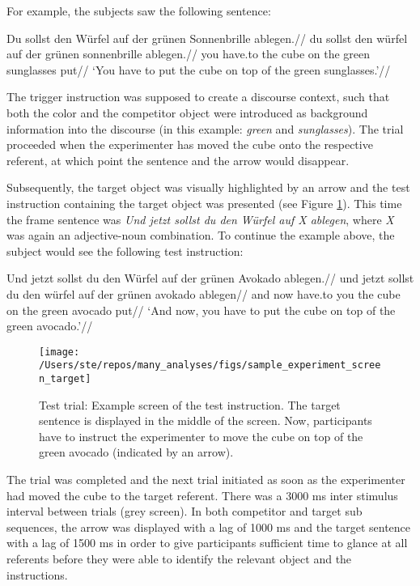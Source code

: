 \documentclass[
  12pt,
]{article}
\begin{document}
For example, the subjects saw the following sentence:

\ex \begingl
\glpreamble Du sollst den Würfel auf der grünen Sonnenbrille ablegen.//
\gla du sollst den würfel auf der grünen sonnenbrille ablegen.//
\glb you have.to the cube on the green sunglasses put//
\glft `You have to put the cube on top of the green sunglasses.'//
\endgl \xe

The trigger instruction was supposed to create a discourse context, such that both the color and the competitor object were introduced as background information into the discourse (in this example: \emph{green} and \emph{sunglasses}).
The trial proceeded when the experimenter has moved the cube onto the respective referent, at which point the sentence and the arrow would disappear.

Subsequently, the target object was visually highlighted by an arrow and the test instruction containing the target object was presented (see Figure \ref{fig:image2}).
This time the frame sentence was \emph{Und jetzt sollst du den Würfel auf X ablegen}, where \emph{X} was again an adjective-noun combination.
To continue the example above, the subject would see the following test instruction:

\ex \begingl
\glpreamble Und jetzt sollst du den Würfel auf der grünen Avokado ablegen.//
\gla und jetzt sollst du den würfel auf der grünen avokado ablegen//
\glb and now have.to you the cube on the green avocado put//
\glft `And now, you have to put the cube on top of the green avocado.'//
\endgl \xe

\begin{figure}[tbp]

{\centering \texttt{[image: /Users/ste/repos/many\_analyses/figs/sample\_experiment\_screen\_target]} 

}

\caption{Test trial: Example screen of the test instruction. The target sentence is displayed in the middle of the screen. Now, participants have to instruct the experimenter to move the cube on top of the green avocado (indicated by an arrow).}\label{fig:image2}
\end{figure}

The trial was completed and the next trial initiated as soon as the experimenter had moved the cube to the target referent.
There was a 3000 ms inter stimulus interval between trials (grey screen).
In both competitor and target sub sequences, the arrow was displayed with a lag of 1000 ms and the target sentence with a lag of 1500 ms in order to give participants sufficient time to glance at all referents before they were able to identify the relevant object and the instructions.
\end{document}
